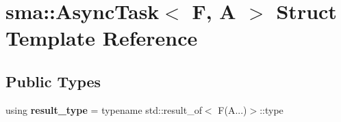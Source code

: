 \hypertarget{structsma_1_1AsyncTask}{\section{sma\-:\-:Async\-Task$<$ F, A $>$ Struct Template Reference}
\label{structsma_1_1AsyncTask}
}
\subsection*{Public Types}
\begin{DoxyCompactItemize}
\item 
\hypertarget{structsma_1_1AsyncTask_aed4904d195c75e0b369cfde8e46580e4}{using {\bfseries result\-\_\-type} = typename std\-::result\-\_\-of$<$ F(A...)$>$\-::type}\label{structsma_1_1AsyncTask_aed4904d195c75e0b369cfde8e46580e4}

\end{DoxyCompactItemize}
